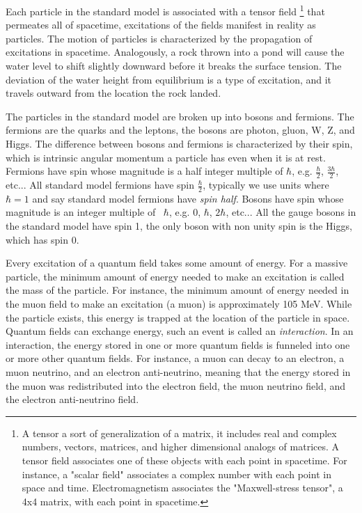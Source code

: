   Each particle in the standard model is associated with a tensor field \footnote{A tensor a sort of generalization of a matrix, it includes real and complex numbers, vectors, matrices, and higher dimensional analogs of matrices. A tensor field associates one of these objects with each point in spacetime. For instance, a "scalar field" associates a complex number with each point in space and time. Electromagnetism associates the "Maxwell-stress tensor", a 4x4 matrix, with each point in spacetime.} that permeates all of spacetime, excitations of the fields manifest in reality as particles. The motion of particles is characterized by the propagation of excitations in spacetime. Analogously, a rock thrown into a pond will cause the water level to shift slightly downward before it breaks the surface tension. The deviation of the water height from equilibrium is a type of excitation, and it travels outward from the location the rock landed. 

  The particles in the standard model are broken up into bosons and fermions. The fermions are the quarks and the leptons, the bosons are photon, gluon, W, Z, and Higgs. The difference between bosons and fermions is characterized by their spin, which is intrinsic angular momentum a particle has even when it is at rest. Fermions have spin whose magnitude is a half integer multiple of $\hbar$, e.g. $\frac{\hbar}{2}$, $\frac{3\hbar}{2}$, etc... All standard model fermions have spin $\frac{\hbar}{2}$, typically we use units where ~$\hbar = 1$ and say standard model fermions have \emph{spin half}. Bosons have spin whose magnitude is an integer multiple of ~$\hbar$, e.g. 0, $\hbar$, $2\hbar$, etc... All the gauge bosons in the standard model have spin 1, the only boson with non unity spin is the Higgs, which has spin 0. 

  Every excitation of a quantum field takes some amount of energy. For a massive particle, the minimum amount of energy needed to make an excitation is called the mass of the particle. For instance, the minimum amount of energy needed in the muon field to make an excitation (a muon) is approximately 105 MeV. While the particle exists, this energy is trapped at the location of the particle in space. Quantum fields can exchange energy, such an event is called an \emph{interaction}. In an interaction, the energy stored in one or more quantum fields is funneled into one or more other quantum fields. For instance, a muon can decay to an electron, a muon neutrino, and an electron anti-neutrino, meaning that the energy stored in the muon was redistributed into the electron field, the muon neutrino field, and the electron anti-neutrino field.

